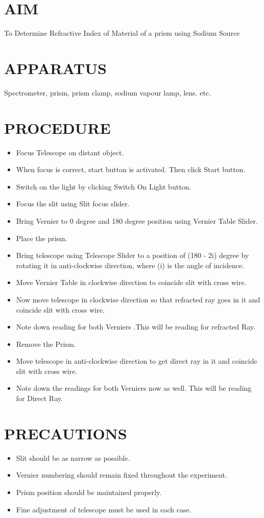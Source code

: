\documentclass{article}
\begin{document}
\section{\LARGE AIM}
\Large
To Determine Refractive Index of Material of a prism using Sodium Source
\section{\LARGE APPARATUS}
Spectrometer, prism, prism clamp, sodium vapour lamp, lens. etc.
\section{\LARGE PROCEDURE}
\begin{itemize}
    \item Focus Telescope on distant object.
    \item When focus is correct, start button is activated. Then click Start button.
    \item Switch on the light by clicking Switch On Light button.
    \item Focus the slit using Slit focus slider.
    \item Bring Vernier to 0 degree and 180 degree position using Vernier Table Slider.
    \item Place the prism.
    \item Bring telescope using Telescope Slider to a position of (180 - 2i) degree by rotating it in anti-clockwise direction, where (i) is the angle of incidence.
    \item Move Vernier Table in clockwise direction to coincide slit with cross wire.
    \item Now move telescope in clockwise direction so that refracted ray goes in it and coincide slit with cross wire. 
    \item Note down reading for both Verniers .This will be reading for refracted Ray. 
    \item Remove the Prism.
    \item Move telescope in anti-clockwise direction to get direct ray in it and coincide slit with cross wire. 
    \item Note down the readings for both Verniers now as well. This will be reading for Direct Ray.
\end{itemize}

\section{\LARGE PRECAUTIONS}
\begin{itemize}
    \item Slit should be as narrow as possible. 
    \item Vernier numbering should remain fixed throughout the experiment.
    \item Prism position should be maintained properly.
    \item Fine adjustment of telescope must be used in each case.
    
\end{itemize}
\newpage
\end{document}
